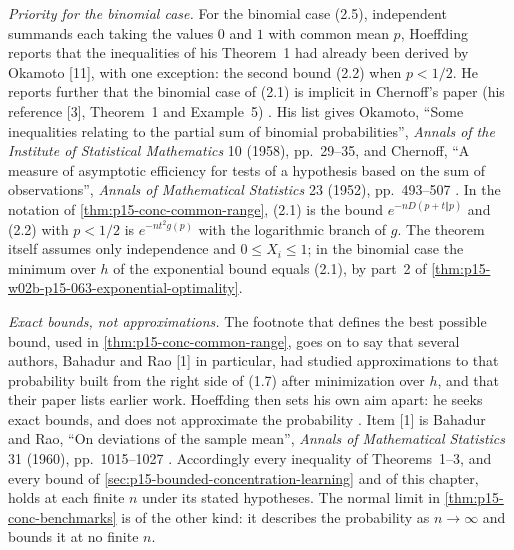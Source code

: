 \emph{Priority for the binomial case.} For the binomial case (2.5),
independent summands each taking the values \(0\) and \(1\) with common
mean \(p\), Hoeffding reports that the inequalities of his Theorem~1 had
already been derived by Okamoto [11], with one exception: the second
bound (2.2) when \(p<1/2\). He reports further that the binomial case of (2.1)
is implicit in Chernoff's paper (his reference [3], Theorem~1 and
Example~5) \cite[pp.~15--16]{Hoeffding1963BoundedSums}. His list
gives Okamoto, ``Some inequalities relating to the partial sum of binomial
probabilities'', \emph{Annals of the Institute of Statistical
Mathematics} 10 (1958), pp.~29--35, and Chernoff, ``A measure of
asymptotic efficiency for tests of a hypothesis based on the sum of
observations'', \emph{Annals of Mathematical Statistics} 23 (1952),
pp.~493--507 \cite[pp.~29--30]{Hoeffding1963BoundedSums}. In the notation
of \cref{thm:p15-conc-common-range}, (2.1) is the bound
\(e^{-nD(p+t\Vert p)}\) and (2.2) with \(p<1/2\) is
\(e^{-nt^2g(p)}\) with the logarithmic branch of \(g\). The theorem itself
assumes only independence and \(0\leq X_i\leq1\); in the binomial case the
minimum over \(h\) of the exponential bound equals (2.1), by part~2 of
\cref{thm:p15-w02b-p15-063-exponential-optimality}.

\emph{Exact bounds, not approximations.} The footnote that defines the
best possible bound, used in \cref{thm:p15-conc-common-range}, goes on
to say that several authors, Bahadur and Rao [1] in particular, had
studied approximations to that probability built from the right side of
(1.7) after minimization over \(h\), and that their paper lists earlier
work. Hoeffding then sets his own aim apart: he seeks exact bounds, and
does not approximate the probability \cite[p.~14 n.~3]{Hoeffding1963BoundedSums}. Item [1] is
Bahadur and Rao, ``On deviations of the sample mean'', \emph{Annals of
Mathematical Statistics} 31 (1960), pp.~1015--1027
\cite[p.~29]{Hoeffding1963BoundedSums}. Accordingly every inequality of
Theorems~1--3, and every bound of
\cref{sec:p15-bounded-concentration-learning} and of this chapter, holds
at each finite \(n\) under its stated hypotheses. The normal limit in
\cref{thm:p15-conc-benchmarks} is of the other kind: it describes the
probability as \(n\to\infty\) and bounds it at no finite \(n\).

